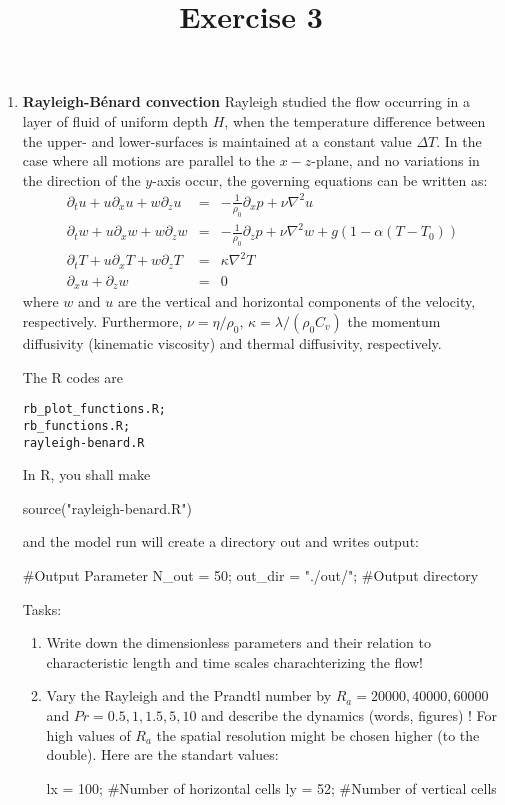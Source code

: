\documentclass[a4paper,12pt]{article}
\title{Exercise 3}
\newcommand{\beqn}{\begin{eqnarray}}
\newcommand{\eeqn}{\end{eqnarray}}
\renewcommand{\beqn}{\begin{eqnarray}}
\renewcommand{\eeqn}{\end{eqnarray}}
\begin{document}
\maketitle
\thispagestyle{fancy}
%

 \begin{enumerate}

\item
{\bf Rayleigh-B\'{e}nard convection }
Rayleigh studied the flow occurring in a layer of fluid of uniform
depth $H$, when the temperature difference between the upper- and lower-surfaces
is maintained at a constant value $\Delta T$.
In the case where all motions are parallel to the $x-z$-plane, and no variations
in the direction of the $y$-axis occur, the governing equations can be written as:
\beqn
    \partial_t u + u \partial_x u + w \partial_z u     & = & - \frac{1}{\rho_0} \partial_x p +        \nu \nabla^2 u  \label{eqref:einse}\\
    \partial_t w + u \partial_x w + w \partial_z w   & = &  - \frac{1}{\rho_0} \partial_z p +        \nu \nabla^2 w + g (1- \alpha (T-T_0))
        \label{eqref:zwei}\\
    \partial_t T + u \partial_x T + w \partial_z T   &=&  \kappa \nabla^2 T 
    \label{eqref:temp}\\
    \partial_x u + \partial_z w   &= &0\label{eqref:kont}
\eeqn
where $w$ and $u$ are the vertical and horizontal components of the velocity,
respectively. 
Furthermore, 
$ \nu = \eta/\rho_0 , \, \kappa = \lambda/(\rho_0 C_v) $ 
the momentum diffusivity (kinematic viscosity) and thermal diffusivity, respectively.


The R codes are 
\begin{verbatim}
rb_plot_functions.R; 
rb_functions.R; 
rayleigh-benard.R
\end{verbatim}
In R, you shall make
\begin{rcode}
source("rayleigh-benard.R")
\end{rcode}
and the model run will create a directory out and writes output: 
\begin{rcode}
#Output Parameter
N_out = 50;
out_dir = "./out/";	#Output directory
\end{rcode}


Tasks:
 \begin{enumerate}
 \item
 Write down the dimensionless parameters and their relation to characteristic length and time scales charachterizing the flow!
 \item
Vary the Rayleigh and the Prandtl number by 
$R_a= 20000, 40000, 60000$  and
$Pr= 0.5, 1, 1.5, 5, 10 $ and 
describe the dynamics (words, figures) !
For high values of $R_a$ the spatial resolution might be chosen higher (to the double). Here are the standart values:
\begin{rcode}
lx 	= 100;		#Number of horizontal cells
ly	= 52;		#Number of vertical cells
\end{rcode}



\end{enumerate}
\end{enumerate}
\end{document}
